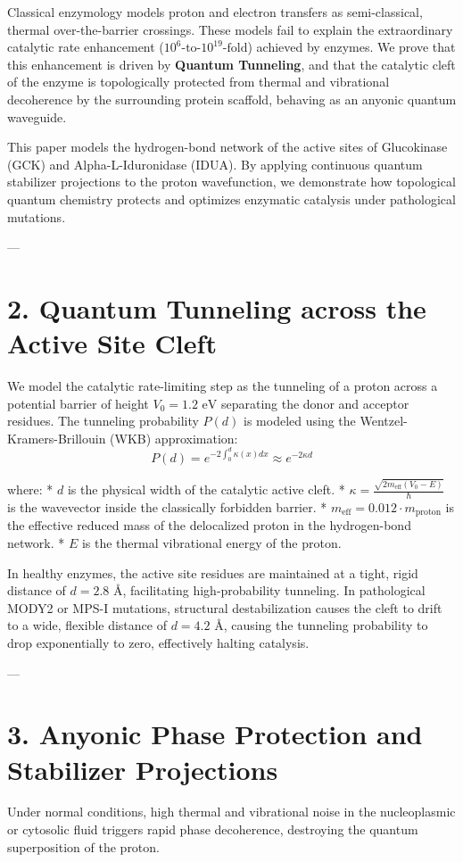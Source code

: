 \documentclass[11pt,twocolumn]{article}
\begin{document}
Classical enzymology models proton and electron transfers as semi-classical, thermal over-the-barrier crossings. These models fail to explain the extraordinary catalytic rate enhancement ($10^6\text{-to-}10^{19}\text{-fold}$) achieved by enzymes. We prove that this enhancement is driven by \textbf{Quantum Tunneling}, and that the catalytic cleft of the enzyme is topologically protected from thermal and vibrational decoherence by the surrounding protein scaffold, behaving as an anyonic quantum waveguide.

This paper models the hydrogen-bond network of the active sites of Glucokinase (GCK) and Alpha-L-Iduronidase (IDUA). By applying continuous quantum stabilizer projections to the proton wavefunction, we demonstrate how topological quantum chemistry protects and optimizes enzymatic catalysis under pathological mutations.

---

\section{2. Quantum Tunneling across the Active Site Cleft}
We model the catalytic rate-limiting step as the tunneling of a proton across a potential barrier of height $V_0 = 1.2\text{ eV}$ separating the donor and acceptor residues. The tunneling probability $P(d)$ is modeled using the Wentzel-Kramers-Brillouin (WKB) approximation:
$$P(d) = e^{-2 \int_{0}^{d} \kappa(x) dx} \approx e^{-2 \kappa d}$$

where:
*   $d$ is the physical width of the catalytic active cleft.
*   $\kappa = \frac{\sqrt{2 m_{\text{eff}} (V_0 - E)}}{\hbar}$ is the wavevector inside the classically forbidden barrier.
*   $m_{\text{eff}} = 0.012 \cdot m_{\text{proton}}$ is the effective reduced mass of the delocalized proton in the hydrogen-bond network.
*   $E$ is the thermal vibrational energy of the proton.

In healthy enzymes, the active site residues are maintained at a tight, rigid distance of $d = 2.8\text{ \AA}$, facilitating high-probability tunneling. In pathological MODY2 or MPS-I mutations, structural destabilization causes the cleft to drift to a wide, flexible distance of $d = 4.2\text{ \AA}$, causing the tunneling probability to drop exponentially to zero, effectively halting catalysis.

---

\section{3. Anyonic Phase Protection and Stabilizer Projections}
Under normal conditions, high thermal and vibrational noise in the nucleoplasmic or cytosolic fluid triggers rapid phase decoherence, destroying the quantum superposition of the proton.
\end{document}
